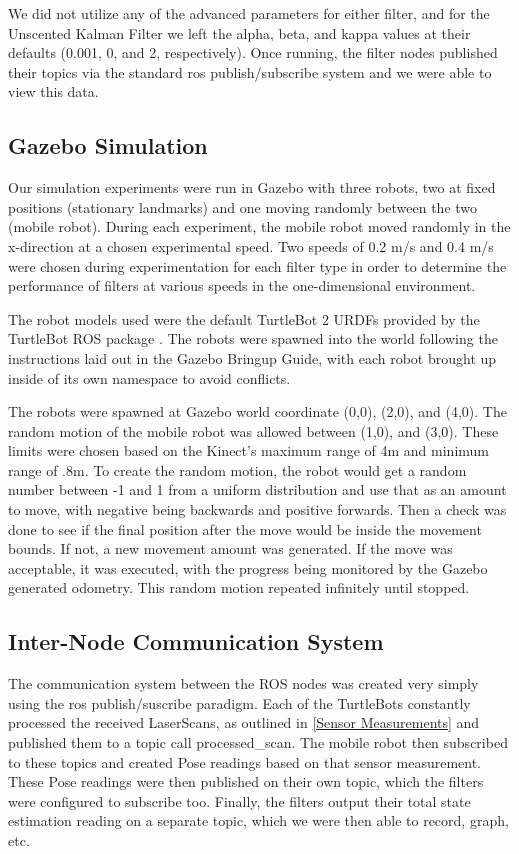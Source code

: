 \documentclass[conference]{IEEEtran}
\begin{document}
We did not utilize any of the advanced parameters for either filter, and for the Unscented Kalman Filter we left the
alpha, beta, and kappa values at their defaults (0.001, 0, and 2, respectively). Once running, the filter nodes
published their topics via the standard ros publish/subscribe system and we were able to view this data.


\subsection{Gazebo Simulation}
Our simulation experiments were run in Gazebo with three robots, two at fixed positions (stationary landmarks) and one
moving randomly between the two (mobile robot). During each experiment, the mobile robot moved randomly in the
x-direction at a chosen experimental speed. Two speeds of 0.2 m/s and 0.4 m/s were chosen during experimentation for
each filter type in order to determine the performance of filters at various speeds in the one-dimensional environment.

The robot models used were the default TurtleBot 2 URDFs provided by the TurtleBot ROS package \cite{turtlebot}. The
robots were spawned into the world following the instructions laid out in the Gazebo Bringup Guide, with each robot
brought up inside of its own namespace to avoid conflicts.

The robots were spawned at Gazebo world coordinate (0,0), (2,0), and (4,0). The random motion of the mobile robot was
allowed between (1,0), and (3,0). These limits were chosen based on the Kinect's maximum range of 4m and minimum range
of .8m. To create the random motion, the robot would get a random number between -1 and 1 from a uniform distribution
and use that as an amount to move, with negative being backwards and positive forwards. Then a check was done to see if
the final position after the move would be inside the movement bounds. If not, a new movement amount was generated. If
the move was acceptable, it was executed, with the progress being monitored by the Gazebo generated odometry. This
random motion repeated infinitely until stopped.

\subsection{Inter-Node Communication System}
The communication system between the ROS nodes was created very simply using the ros publish/suscribe paradigm. Each of
the TurtleBots constantly processed the received LaserScans, as outlined in \ref{Sensor Measurements} and published
them to a topic call processed\_scan. The mobile robot then subscribed to these topics and created Pose readings based
on that sensor measurement. These Pose readings were then published on their own topic, which the filters were
configured to subscribe too. Finally, the filters output their total state estimation reading on a separate topic,
which we were then able to record, graph, etc.
\end{document}
